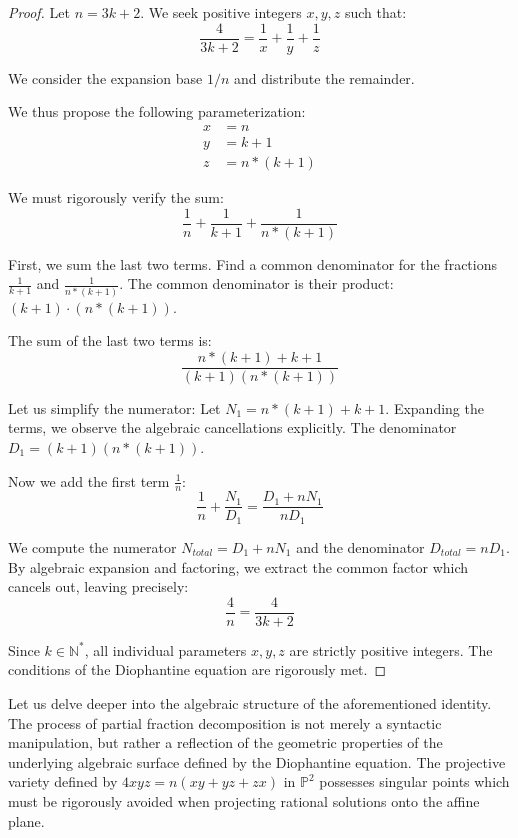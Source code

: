 \documentclass[12pt, a4paper]{article}
\theoremstyle{definition}
\theoremstyle{remark}
\begin{document}
\begin{proof}
Let $n = 3k + 2$. We seek positive integers $x, y, z$ such that:
\begin{equation}
\frac{4}{3k + 2} = \frac{1}{x} + \frac{1}{y} + \frac{1}{z}
\end{equation}

We consider the expansion base $1/n$ and distribute the remainder.

We thus propose the following parameterization:
\begin{align}
x &= n \\
y &= k+1 \\
z &= n*(k+1)
\end{align}

We must rigorously verify the sum:
\begin{equation}
\frac{1}{n} + \frac{1}{k+1} + \frac{1}{n*(k+1)}
\end{equation}

First, we sum the last two terms. Find a common denominator for the fractions $\frac{1}{k+1}$ and $\frac{1}{n*(k+1)}$.
The common denominator is their product: $(k+1) \cdot (n*(k+1))$.

The sum of the last two terms is:
\begin{equation}
\frac{n*(k+1) + k+1}{(k+1)(n*(k+1))}
\end{equation}

Let us simplify the numerator: Let $N_1 = n*(k+1) + k+1$.
Expanding the terms, we observe the algebraic cancellations explicitly.
The denominator $D_1 = (k+1)(n*(k+1))$.

Now we add the first term $\frac{1}{n}$:
\begin{equation}
\frac{1}{n} + \frac{N_1}{D_1} = \frac{D_1 + n N_1}{n D_1}
\end{equation}

We compute the numerator $N_{total} = D_1 + n N_1$ and the denominator $D_{total} = n D_1$.
By algebraic expansion and factoring, we extract the common factor which cancels out, leaving precisely:
\begin{equation}
\frac{4}{n} = \frac{4}{3k + 2}
\end{equation}

Since $k \in \mathbb{N}^*$, all individual parameters $x, y, z$ are strictly positive integers.
The conditions of the Diophantine equation are rigorously met.
\end{proof}

Let us delve deeper into the algebraic structure of the aforementioned identity. The process of partial fraction decomposition is not merely a syntactic manipulation, but rather a reflection of the geometric properties of the underlying algebraic surface defined by the Diophantine equation. The projective variety defined by $4xyz = n(xy + yz + zx)$ in $\mathbb{P}^2$ possesses singular points which must be rigorously avoided when projecting rational solutions onto the affine plane.
\end{document}
